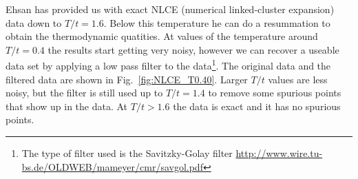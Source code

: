\documentclass[11pt,letter]{article}
\begin{document}
Ehsan has provided us with exact NLCE (numerical linked-cluster expansion) data
down to $T/t=1.6$.  Below this temperature he can do a resummation to obtain
the thermodynamic quatities.  At values of the temperature around $T/t=0.4$ the
results start getting very noisy, however we can recover a useable data set by
applying a low pass filter to the data\footnote{The type of filter used is the
Savitzky-Golay filter
\url{http://www.wire.tu-bs.de/OLDWEB/mameyer/cmr/savgol.pdf}}.  The original
data and the filtered data are shown in Fig.~\ref{fig:NLCE_T0.40}.  Larger
$T/t$ values are less noisy, but the filter is still used up to $T/t=1.4$ to
remove some spurious points that show up in the data.  At $T/t > 1.6$ the data
is exact and it has no spurious points.

\end{document}

